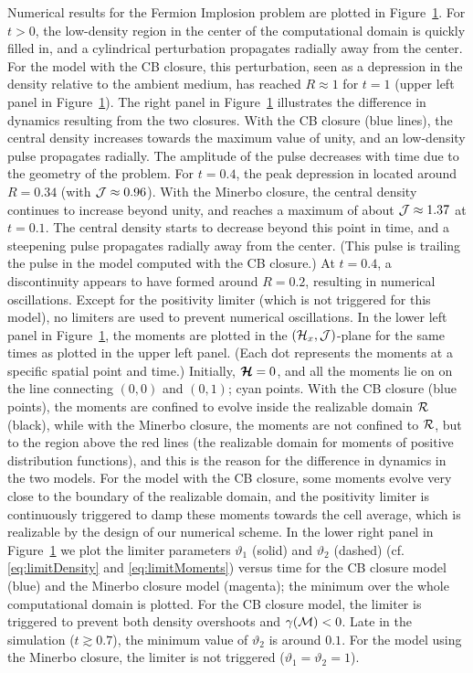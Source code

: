 \begin{figure}[h]
  \label{fig:Implosion}
\end{figure}

Numerical results for the Fermion Implosion problem are plotted in Figure~\ref{fig:Implosion}.  
For $t>0$, the low-density region in the center of the computational domain is quickly filled in, and a cylindrical perturbation propagates radially away from the center.  
For the model with the CB closure, this perturbation, seen as a depression in the density relative to the ambient medium, has reached $R\approx1$ for $t=1$ (upper left panel in Figure~\ref{fig:Implosion}).  
The right panel in Figure~\ref{fig:Implosion} illustrates the difference in dynamics resulting from the two closures.  
With the CB closure (blue lines), the central density increases towards the maximum value of unity, and an low-density pulse propagates radially.  
The amplitude of the pulse decreases with time due to the geometry of the problem.  
For $t=0.4$, the peak depression in located around $R=0.34$ (with $\mathcal{J}\approx0.96$).  
With the Minerbo closure, the central density continues to increase beyond unity, and reaches a maximum of about $\mathcal{J}\approx1.37$ at $t=0.1$.  
The central density starts to decrease beyond this point in time, and a steepening pulse propagates radially away from the center.  
(This pulse is trailing the pulse in the model computed with the CB closure.)  
At $t=0.4$, a discontinuity appears to have formed around $R=0.2$, resulting in numerical oscillations.  
Except for the positivity limiter (which is not triggered for this model), no limiters are used to prevent numerical oscillations.  
In the lower left panel in Figure~\ref{fig:Implosion}, the moments are plotted in the $(\mathcal{H}_{x},\mathcal{J})$-plane for the same times as plotted in the upper left panel.  
(Each dot represents the moments at a specific spatial point and time.)  
Initially, $\boldsymbol{\mathcal{H}}=0$, and all the moments lie on on the line connecting $(0,0)$ and $(0,1)$; cyan points.  
With the CB closure (blue points), the moments are confined to evolve inside the realizable domain $\mathcal{R}$ (black), while with the Minerbo closure, the moments are not confined to $\mathcal{R}$, but to the region above the red lines (the realizable domain for moments of positive distribution functions), and this is the reason for the difference in dynamics in the two models.  
For the model with the CB closure, some moments evolve very close to the boundary of the realizable domain, and the positivity limiter is continuously triggered to damp these moments towards the cell average, which is realizable by the design of our numerical scheme.  
In the lower right panel in Figure~\ref{fig:Implosion} we plot the limiter parameters $\vartheta_{1}$ (solid) and $\vartheta_{2}$ (dashed) (cf. \eqref{eq:limitDensity} and \eqref{eq:limitMoments}) versus time for the CB closure model (blue) and the Minerbo closure model (magenta); the minimum over the whole computational domain is plotted.  
For the CB closure model, the limiter is triggered to prevent both density overshoots and $\gamma(\mathcal{M})<0$.  
Late in the simulation ($t\gtrsim0.7$), the minimum value of $\vartheta_{2}$ is around $0.1$.  
For the model using the Minerbo closure, the limiter is not triggered ($\vartheta_{1}=\vartheta_{2}=1$).  


